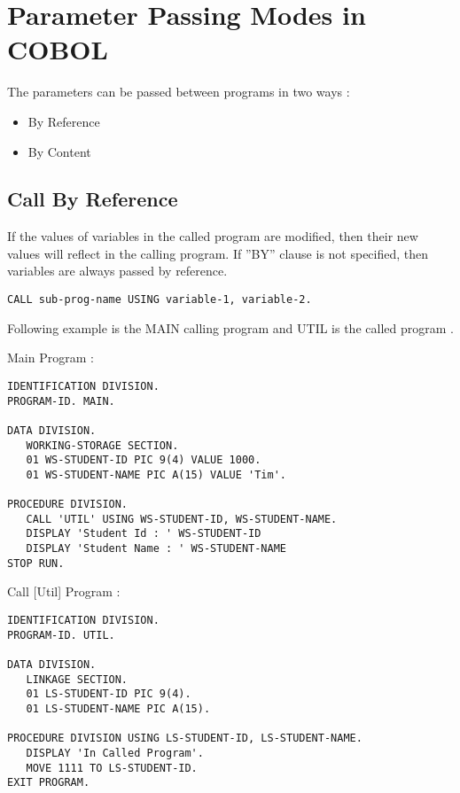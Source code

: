 \documentclass[12pt]{article}
\begin{document}
\section{Parameter Passing Modes in COBOL}

The parameters can be passed between programs in two ways :

\begin{itemize}
	\item By Reference
	\item By Content
\end{itemize}


\newpage

\subsection{Call By Reference}

If the values of variables in the called program are modified, then their new values will reflect in the calling program. If ''BY'' clause is not specified, then variables are always passed by reference.

\begin{lstlisting}[language=Cobol]
CALL sub-prog-name USING variable-1, variable-2.
\end{lstlisting}

Following example is the MAIN calling program and UTIL is the called program .

Main Program :
\begin{lstlisting}[language=Cobol]
IDENTIFICATION DIVISION.
PROGRAM-ID. MAIN.

DATA DIVISION.
   WORKING-STORAGE SECTION.
   01 WS-STUDENT-ID PIC 9(4) VALUE 1000.
   01 WS-STUDENT-NAME PIC A(15) VALUE 'Tim'.

PROCEDURE DIVISION.
   CALL 'UTIL' USING WS-STUDENT-ID, WS-STUDENT-NAME.
   DISPLAY 'Student Id : ' WS-STUDENT-ID
   DISPLAY 'Student Name : ' WS-STUDENT-NAME
STOP RUN.
\end{lstlisting}


Call [Util] Program :
\begin{lstlisting}[language=Cobol]
IDENTIFICATION DIVISION.
PROGRAM-ID. UTIL.

DATA DIVISION.
   LINKAGE SECTION.
   01 LS-STUDENT-ID PIC 9(4).
   01 LS-STUDENT-NAME PIC A(15).

PROCEDURE DIVISION USING LS-STUDENT-ID, LS-STUDENT-NAME.
   DISPLAY 'In Called Program'.
   MOVE 1111 TO LS-STUDENT-ID.
EXIT PROGRAM.
\end{lstlisting}
\end{document}
